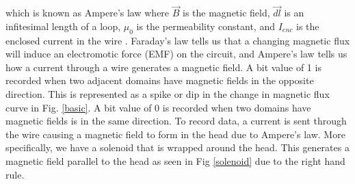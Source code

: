 \documentclass[ notitlepage, numerical, 11pt]{revtex4-1} %
\begin{document}
which is known as Ampere's law where $\vec{B}$ is the magnetic field, $\vec{dl}$ is an infitesimal length of a loop, $\mu_0$ is the permeability constant, and $I_{enc}$ is the enclosed current in the wire \cite{purcell}. Faraday's law tells us that a changing magnetic flux will induce an electromotic force (EMF) on the circuit, and Ampere's law tells us how a current through a wire generates a magnetic field. A bit value of 1 is recorded when two adjacent domains have magnetic fields in the opposite direction. This is represented as a spike or dip in the change in magnetic flux curve in Fig. \ref{basic}. A bit value of 0 is recorded when two domains have magnetic fields is in the same direction. To record data, a current is sent through the wire causing a magnetic field to form in the head due to Ampere's law. More specifically, we have a solenoid that is wrapped around the head. This generates a magnetic field parallel to the head as seen in Fig \ref{solenoid} due to the right hand rule. 
\end{document}
